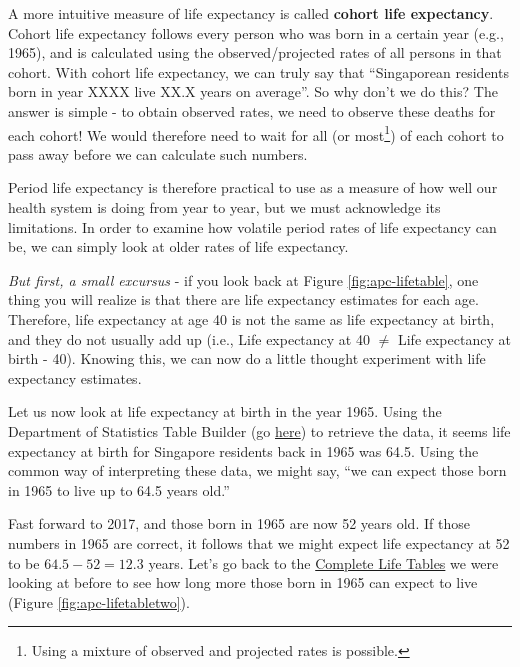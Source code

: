 \documentclass[
  openany]{book}
\begin{document}
A more intuitive measure of life expectancy is called \textbf{cohort life expectancy}. Cohort life expectancy follows every person who was born in a certain year (e.g., 1965), and is calculated using the observed/projected rates of all persons in that cohort. With cohort life expectancy, we can truly say that ``Singaporean residents born in year XXXX live XX.X years on average''. So why don't we do this? The answer is simple - to obtain observed rates, we need to observe these deaths for each cohort! We would therefore need to wait for all (or most\footnote{Using a mixture of observed and projected rates is possible.}) of each cohort to pass away before we can calculate such numbers.

Period life expectancy is therefore practical to use as a measure of how well our health system is doing from year to year, but we must acknowledge its limitations. In order to examine how volatile period rates of life expectancy can be, we can simply look at older rates of life expectancy.

\emph{But first, a small excursus} - if you look back at Figure \ref{fig:apc-lifetable}, one thing you will realize is that there are life expectancy estimates for each age. Therefore, life expectancy at age 40 is not the same as life expectancy at birth, and they do not usually add up (i.e., Life expectancy at 40 \(\neq\) Life expectancy at birth - 40). Knowing this, we can now do a little thought experiment with life expectancy estimates.

Let us now look at life expectancy at birth in the year 1965. Using the Department of Statistics Table Builder (go \href{https://www.tablebuilder.singstat.gov.sg/publicfacing/createDataTable.action?refId=13276}{here}) to retrieve the data, it seems life expectancy at birth for Singapore residents back in 1965 was 64.5. Using the common way of interpreting these data, we might say, ``we can expect those born in 1965 to live up to 64.5 years old.''

Fast forward to 2017, and those born in 1965 are now 52 years old. If those numbers in 1965 are correct, it follows that we might expect life expectancy at 52 to be \(64.5 - 52 = 12.3\) years. Let's go back to the \href{https://www.singstat.gov.sg/-/media/files/publications/population/lifetable17-18.pdf}{Complete Life Tables} we were looking at before to see how long more those born in 1965 can expect to live (Figure \ref{fig:apc-lifetabletwo}).
\end{document}

